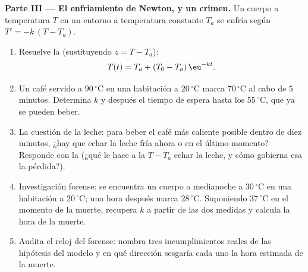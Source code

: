 \begin{problem}
\medskip
\noindent\textbf{Parte III --- El enfriamiento de Newton, y un
crimen.}
Un cuerpo a temperatura $T$ en un entorno a temperatura constante $T_a$ se
enfría según $T' = -k\,(T - T_a)$.
\begin{enumerate}[resume]
  \item Resuelve la  (sustituyendo $z = T - T_a$):
        \[
        T(t) = T_a + (T_0 - T_a)\,\eu^{-kt} .
        \]
  \item Un café servido a $90\,^\circ$C en una habitación a
        $20\,^\circ$C marca $70\,^\circ$C al cabo de $5$ minutos.
        Determina $k$ y después el tiempo de espera hasta los
        $55\,^\circ$C, que ya se pueden beber.
  \item La cuestión de la leche: para beber el café más caliente posible
        dentro de diez minutos, ¿hay que echar la leche fría ahora o en el
        último momento? Responde con la  (¿qué le hace a la
         $T - T_a$ echar la leche, y cómo gobierna esa 
        la pérdida?).
  \item Investigación forense: se encuentra un cuerpo a medianoche a
        $30\,^\circ$C en una habitación a $20\,^\circ$C; una hora después
        marca $28\,^\circ$C. Suponiendo $37\,^\circ$C en el momento de la
        muerte, recupera $k$ a partir de las dos medidas y calcula la hora
        de la muerte.
  \item Audita el reloj del forense: nombra tres incumplimientos reales de
        las hipótesis del modelo y en qué dirección sesgaría cada uno la
        hora estimada de la muerte.
\end{enumerate}


\end{problem}
